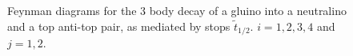\documentclass[final,3p,times]{elsarticle}
\begin{document}
\begin{figure}
  \caption{Feynman diagrams for the 3 body decay of a gluino into a
    neutralino and a top anti-top pair, as mediated by stops
    $\tilde{t}_{1/2}$. $i=1,2,3,4$ and $j=1,2$.} \label{gneutqqdiag}
\end{figure} 
\end{document}
